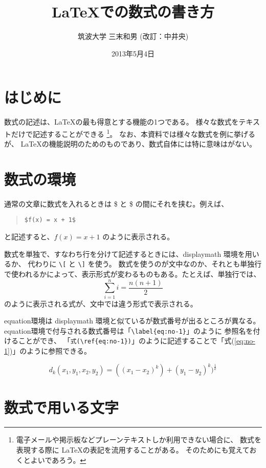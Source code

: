 \documentclass[fontsize=12pt,paper=a4]{jlreq}
\title{\LaTeX での数式の書き方}
\author{筑波大学 三末和男 (改訂：中井央)}
\date{2013年5月4日}
\begin{document}
\maketitle

\section{はじめに}

数式の記述は、\LaTeX の最も得意とする機能の1つである。
様々な数式をテキストだけで記述することができる
\footnote{電子メールや掲示板などプレーンテキストしか利用できない場合に、
数式を表現する際に \LaTeX の表記を流用することがある。
そのためにも覚えておくとよいであろう。}。
なお、本資料では様々な数式を例に挙げるが、
\LaTeX の機能説明のためのものであり、数式自体には特に意味はがない。



\section{数式の環境}\label{sec:math}

通常の文章に数式を入れるときは \$ と \$ の間にそれを挟む。例えば、
\begin{quote}
\begin{verbatim}
$f(x) = x + 1$
\end{verbatim}
\end{quote}
と記述すると、$f(x) = x + 1$ のように表示される。

数式を単独で、すなわち行を分けて記述するときには、displaymath 環境を用いるか、
代わりに \verb+\[+ と \verb+\]+ を使う。
数式を使うのが文中なのか、それとも単独行で使われるかによって、表示形式が変わるものもある。たとえば、単独行では、
\[
\sum_{i=1}^{n} i = \frac{n (n + 1)}{2}
\]
\noindent
のように表示される式が、文中では違う形式で表示される。

equation環境は displaymath 環境と似ているが数式番号が出るところが異なる。
equation環境で付与される数式番号は「\verb|\label{eq:no-1}|」のように
参照名を付けることができ、
「\verb|式(\ref{eq:no-1})|」のように記述することで「式(\ref{eq:no-1})」のように参照できる。

\begin{equation}
d_{k}(x_{1},y_{1},x_{2},y_{2})  = ((x_{1}-x_{2})^{k})+(y_{1}-y_{2})^{k})^{\frac{1}{k}}
\label{eq:no-1}
\end{equation}



\section{数式で用いる文字}
\end{document}
